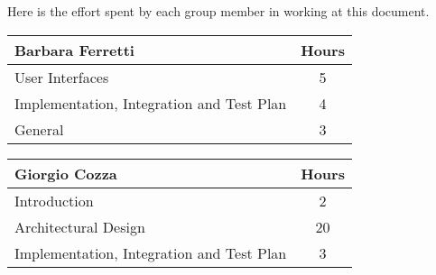 Here is the effort spent by each group member in working at this document.

\begin{table}[H]
\begin{tabular}{|l|c|}
\hline
\textbf{Barbara Ferretti} & \multicolumn{1}{l|}{\textbf{Hours}} \\ \hline
User Interfaces                     & 5                                   \\ \hline
Implementation, Integration and Test Plan & 4 \\ \hline
General  & 3 \\ \hline
\end{tabular}
\end{table}

\begin{table}[H]
	\begin{tabular}{|l|c|}
		\hline
		\textbf{Giorgio Cozza} & \multicolumn{1}{l|}{\textbf{Hours}} \\ \hline
		Introduction & 2 \\ \hline
		Architectural Design & 20 \\ \hline
		Implementation, Integration and Test Plan & 3 \\ \hline
	\end{tabular}
\end{table}

